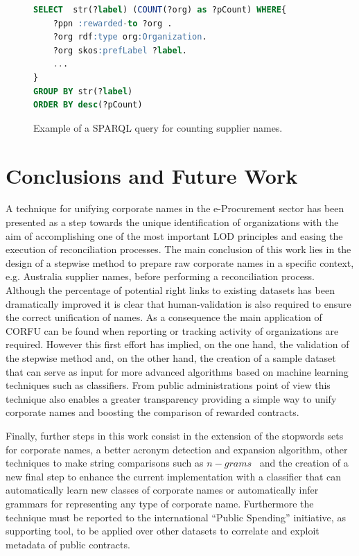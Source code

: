 \documentclass[1p,12pt]{elsarticle}
\begin{document}
\begin{figure}[ht]
\begin{lstlisting}[language=SQL]  
SELECT  str(?label) (COUNT(?org) as ?pCount) WHERE{
	?ppn :rewarded-to ?org .
	?org rdf:type org:Organization.
	?org skos:prefLabel ?label.
	...
}
GROUP BY str(?label) 
ORDER BY desc(?pCount)
\end{lstlisting}
\caption{Example of a SPARQL query for counting supplier names. }
		\label{fig:results-sparql}
\end{figure}

\section{Conclusions and Future Work}
A technique for unifying corporate names in the e-Procurement sector has been 
presented as a step towards the unique identification of organizations 
with the aim of accomplishing one of the most important LOD principles 
and easing the execution of reconciliation processes. The main conclusion of this work 
lies in the design of a stepwise method to prepare raw corporate names in a specific 
context, e.g. Australia supplier names, before performing a reconciliation process. 
Although the percentage of potential right links to existing datasets has been dramatically 
improved it is clear that human-validation is also required to ensure the 
correct unification of names. As a consequence the main application of CORFU 
can be found when reporting or tracking activity of organizations are required. 
However this first effort has implied, on the one hand, the validation 
of the stepwise method and, on the other hand, the creation of a sample dataset 
that can serve as input for more advanced algorithms based on machine learning 
techniques such as classifiers. From public administrations point of view 
this technique also enables a greater transparency providing a simple 
way to unify corporate names and boosting the comparison of rewarded contracts.

Finally, further steps in this work consist in the extension of the stopwords sets 
for corporate names, a better acronym detection and expansion algorithm, other techniques to 
make string comparisons such as $n-grams$~\citep{Sidorov2014853} and the creation of a new final step to enhance 
the current implementation with a classifier that can automatically learn new classes of corporate names or automatically infer grammars for representing any type of corporate name. 
Furthermore the technique must be reported to the international ``Public Spending'' initiative, as supporting tool, to be applied over other datasets to correlate and exploit metadata of public contracts.
\end{document}
